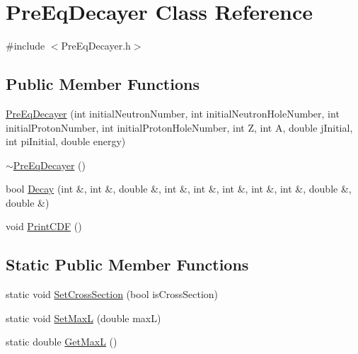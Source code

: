 \hypertarget{classPreEqDecayer}{\section{Pre\-Eq\-Decayer Class Reference}
\label{classPreEqDecayer}
}


{\ttfamily \#include $<$Pre\-Eq\-Decayer.\-h$>$}

\subsection*{Public Member Functions}
\begin{DoxyCompactItemize}
\item 
\hyperlink{classPreEqDecayer_a8eafff7cfc561e9de6e201d0efb4809f}{Pre\-Eq\-Decayer} (int initial\-Neutron\-Number, int initial\-Neutron\-Hole\-Number, int initial\-Proton\-Number, int initial\-Proton\-Hole\-Number, int Z, int A, double j\-Initial, int pi\-Initial, double energy)
\item 
\hyperlink{classPreEqDecayer_a7f7ab17d5c24d2977251d1977d782ba9}{$\sim$\-Pre\-Eq\-Decayer} ()
\item 
bool \hyperlink{classPreEqDecayer_a11702c60685b81a22d020fee52a70154}{Decay} (int \&, int \&, double \&, int \&, int \&, int \&, int \&, int \&, double \&, double \&)
\item 
void \hyperlink{classPreEqDecayer_ab10910a634239b5ce881b910049e0f2f}{Print\-C\-D\-F} ()
\end{DoxyCompactItemize}
\subsection*{Static Public Member Functions}
\begin{DoxyCompactItemize}
\item 
static void \hyperlink{classPreEqDecayer_ad03cef42114b546909988e4729ef2e0a}{Set\-Cross\-Section} (bool is\-Cross\-Section)
\item 
static void \hyperlink{classPreEqDecayer_ae113b36bfc5c46899d8ddaa6e1c4595a}{Set\-Max\-L} (double max\-L)
\item 
static double \hyperlink{classPreEqDecayer_a00e359b531369a0471b9c4dfc0b9ac6e}{Get\-Max\-L} ()
\end{DoxyCompactItemize}


